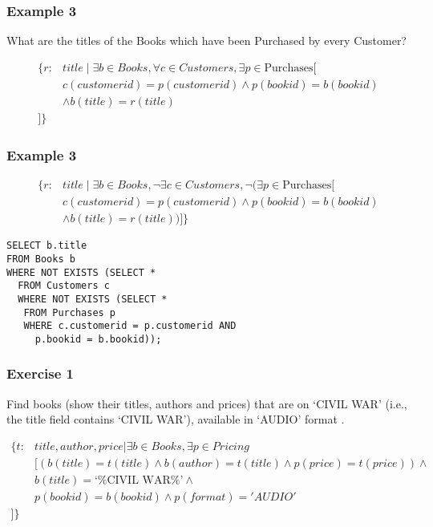 \documentclass{beamer}
\begin{document}
\begin{frame}[fragile]
\frametitle{Example 3}
What are the titles of the Books which have been Purchased by every Customer?

\begin{align*}
\{r:&title \mid \exists b \in Books, \forall c \in Customers, \exists p \in \text{Purchases} [\\
  &c(customerid) = p(customerid) \land  p(bookid) = b(bookid) \\
  &\land b(title) = r(title)\\
]\}
\end{align*}

\end{frame}

\begin{frame}[fragile]
\frametitle{Example 3}
\begin{align*}
\{r:&title \mid \exists b \in Books, \neg \exists c \in Customers, \neg \big(\exists p \in \text{Purchases} [\\
  &c(customerid) = p(customerid) \land  p(bookid) = b(bookid) \\
  &\land b(title) = r(title)\big)]\}
\end{align*}
\begin{lstlisting}
SELECT b.title
FROM Books b
WHERE NOT EXISTS (SELECT *
  FROM Customers c
  WHERE NOT EXISTS (SELECT *
   FROM Purchases p
   WHERE c.customerid = p.customerid AND
     p.bookid = b.bookid));
\end{lstlisting}
\end{frame}

\begin{frame}[fragile]
  \frametitle{Exercise 1}
  Find books (show their titles, authors and prices) that are on `CIVIL WAR' (i.e., the title field contains `CIVIL WAR'), available in `AUDIO' format \footnotemark {}. 

\begin{align*}
\{t: &title, author, price| \exists b \in Books, \exists p \in Pricing \\
&[(b(title)=t(title)\wedge b(author)=t(title) \wedge p(price)=t(price)) \wedge \\
& b(title)=\text{`\%CIVIL WAR\%'} \wedge \\
& p(bookid)=b(bookid) \wedge p(format)='AUDIO'\\
]\}
\end{align*}
\end{frame}
\end{document}
